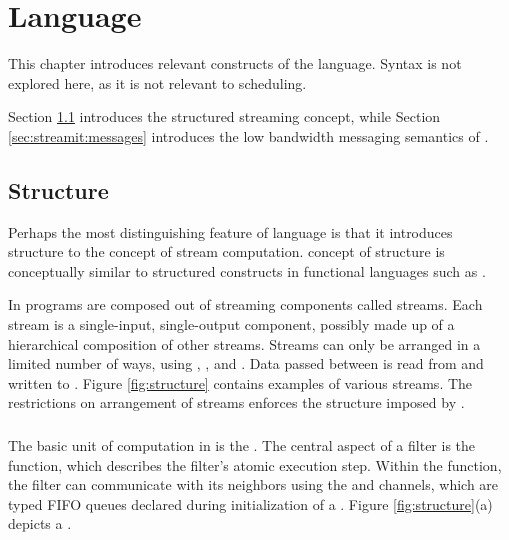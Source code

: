 \section{{\StreamIt} Language}
\label{chpt:streamit}

This chapter introduces relevant constructs of the {\StreamIt}
language.  Syntax is not explored here, as it is not relevant to
{\StreamIt} scheduling.

Section \ref{sec:streamit:struct} introduces the structured
streaming concept, while Section \ref{sec:streamit:messages}
introduces the low bandwidth messaging semantics of {\StreamIt}.

\subsection{Structure}
\label{sec:streamit:struct}

Perhaps the most distinguishing feature of {\StreamIt} language is
that it introduces structure to the concept of stream computation.
{\StreamIt} concept of structure is conceptually similar to
structured constructs in functional languages such as \C.

In {\StreamIt} programs are composed out of streaming components
called streams.  Each stream is a single-input, single-output
component, possibly made up of a hierarchical composition of other
streams. Streams can only be arranged in a limited number of ways,
using {\pipelines}, {\splitjoins}, and {\feedbackloops}.  Data
passed between {\filters} is read from and written to {\Channels}.
Figure \ref{fig:structure} contains examples of various
{\StreamIt} streams.  The restrictions on arrangement of streams
enforces the structure imposed by {\StreamIt}.

\subsubsection{\filters}

The basic unit of computation in {\StreamIt} is the {\filter}. The
central aspect of a filter is the {\work} function, which
describes the filter's atomic execution step. Within the {\work}
function, the filter can communicate with its neighbors using the
{\Input} and {\Output} channels, which are typed FIFO queues
declared during initialization of a {\filter}.  Figure
\ref{fig:structure}(a) depicts a {\filter}.

